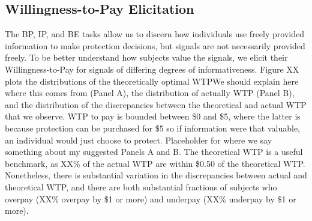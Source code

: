 \documentclass[12pt,a4paper]{article}
\newcommand{\pmt}[1]{{\color{Blue}#1}}
\begin{document}
\begin{figure}[H]
	\hfill
	\hfill
\end{figure}
\clearpage


\subsection{Willingness-to-Pay Elicitation}
The BP, IP, and BE tasks allow us to discern how individuals use freely provided information to make protection decisions, but signals are not necessarily provided freely.  To be better understand how subjects value the signals, we elicit their Willingness-to-Pay for signals of differing degrees of informativeness.  Figure XX plots the distributions of the theoretically optimal WTP\pmt{We should explain here where this comes from} (Panel A), the distribution of actually WTP (Panel B), and the distribution of the discrepancies between the theoretical and actual WTP that we observe.  WTP to pay is bounded between \$0 and \$5, where the latter is because protection can be purchased for \$5 so if information were that valuable, an individual would just choose to protect.  \pmt{Placeholder for where we say something about my suggested Panels A and B.}  The theoretical WTP is a useful benchmark, as XX\% of the actual WTP are within \$0.50 of the theoretical WTP.  Nonetheless, there is substantial variation in the discrepancies between actual and theoretical WTP, and there are both substantial fractions of subjects who overpay (XX\% overpay by \$1 or more) and underpay (XX\% underpay by \$1 or more).


\end{document}
